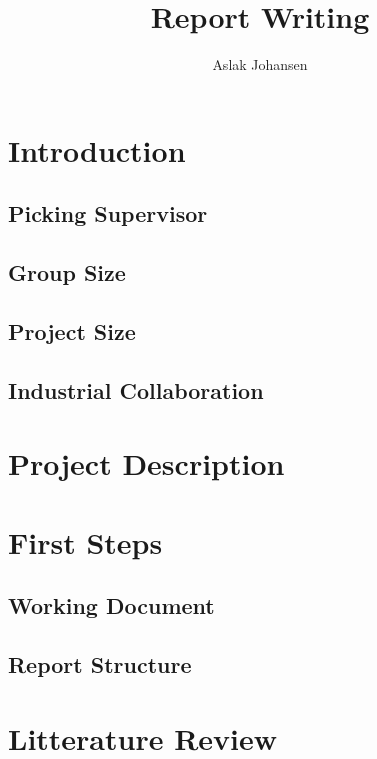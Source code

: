 \documentclass[a4paper]{memoir}
\title{Report Writing \\ \scalebox{0.85}{for Software BSc and MSc Projects}}
\author{Aslak Johansen}
\begin{document}
\maketitle
\tableofcontents

\chapter{Introduction}

\section{Picking Supervisor}

\section{Group Size}

\section{Project Size}

\section{Industrial Collaboration}

\chapter{Project Description}

\chapter{First Steps}

\section{Working Document}

\section{Report Structure}

\chapter{Litterature Review}
\end{document}
